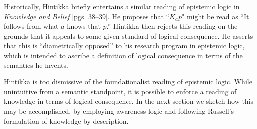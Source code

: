 Historically, Hintikka briefly entertains a similar reading of
epistemic logic in \emph{Knowledge and Belief}
\cite{hintikka_knowledge_1969}[pgs. 38--39].  He proposes that ``$K_a
p$" might be read as ``It follows from what $a$ knows that $p$.''
Hintikka then rejects this reading on the grounds that it appeals to
some given standard of logical consequence.  He asserts that this is
``diametrically opposed'' to his research program in epistemic logic,
which is intended to ascribe a definition of logical consequence in
terms of the semantics he invents.

Hintikka is too dismissive of the foundationalist reading
of epistemic logic.  While unintuitive from a semantic
standpoint, it is possible to enforce a reading of knowledge in terms
of logical consequence. In the next section we sketch how this may be
accomplished, by employing awareness
logic and following Russell's formulation of knowledge by description.




